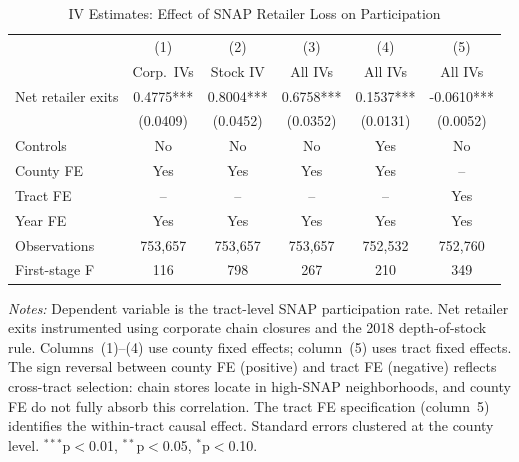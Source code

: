 \begin{table}[t]
\centering
\caption{IV Estimates: Effect of SNAP Retailer Loss on Participation}
\label{tab:iv}
\begin{threeparttable}
\begin{tabular}{lccccc}
\toprule
& (1) & (2) & (3) & (4) & (5) \\
& Corp.\ IVs & Stock IV & All IVs & All IVs & All IVs \\
\midrule
Net retailer exits & 0.4775*** & 0.8004*** & 0.6758*** & 0.1537*** & -0.0610*** \\
& (0.0409) & (0.0452) & (0.0352) & (0.0131) & (0.0052) \\
\midrule
Controls & No & No & No & Yes & No \\
County FE & Yes & Yes & Yes & Yes & -- \\
Tract FE & -- & -- & -- & -- & Yes \\
Year FE & Yes & Yes & Yes & Yes & Yes \\
\midrule
Observations & 753,657 & 753,657 & 753,657 & 752,532 & 752,760 \\
First-stage F & 116 & 798 & 267 & 210 & 349 \\
\bottomrule
\end{tabular}
\begin{tablenotes}
\small
\item \textit{Notes:} Dependent variable is the tract-level SNAP participation rate. Net retailer exits instrumented using corporate chain closures and the 2018 depth-of-stock rule. Columns~(1)--(4) use county fixed effects; column~(5) uses tract fixed effects. The sign reversal between county FE (positive) and tract FE (negative) reflects cross-tract selection: chain stores locate in high-SNAP neighborhoods, and county FE do not fully absorb this correlation. The tract FE specification (column~5) identifies the within-tract causal effect. Standard errors clustered at the county level. $^{***}$p$<$0.01, $^{**}$p$<$0.05, $^{*}$p$<$0.10.
\end{tablenotes}
\end{threeparttable}
\end{table}
